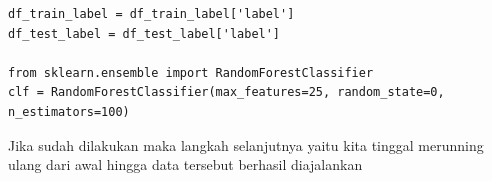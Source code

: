 \begin{enumerate}
\begin{verbatim}
df_train_label = df_train_label['label']
df_test_label = df_test_label['label']

from sklearn.ensemble import RandomForestClassifier
clf = RandomForestClassifier(max_features=25, random_state=0, n_estimators=100)
\end{verbatim}
\subitem Jika sudah dilakukan maka langkah selanjutnya yaitu kita tinggal merunning ulang dari awal hingga data tersebut berhasil diajalankan
\end{enumerate}